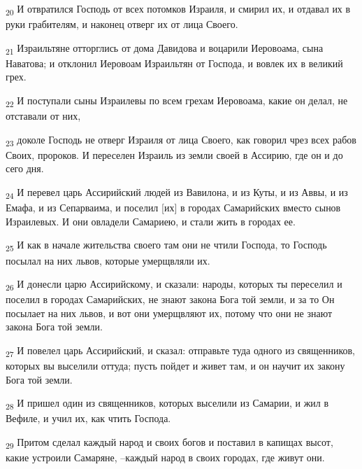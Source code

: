 \begin{tcolorbox}
\textsubscript{20} И отвратился Господь от всех потомков Израиля, и смирил их, и отдавал их в руки грабителям, и наконец отверг их от лица Своего.
\end{tcolorbox}
\begin{tcolorbox}
\textsubscript{21} Израильтяне отторглись от дома Давидова и воцарили Иеровоама, сына Наватова; и отклонил Иеровоам Израильтян от Господа, и вовлек их в великий грех.
\end{tcolorbox}
\begin{tcolorbox}
\textsubscript{22} И поступали сыны Израилевы по всем грехам Иеровоама, какие он делал, не отставали от них,
\end{tcolorbox}
\begin{tcolorbox}
\textsubscript{23} доколе Господь не отверг Израиля от лица Своего, как говорил чрез всех рабов Своих, пророков. И переселен Израиль из земли своей в Ассирию, где он и до сего дня.
\end{tcolorbox}
\begin{tcolorbox}
\textsubscript{24} И перевел царь Ассирийский людей из Вавилона, и из Куты, и из Аввы, и из Емафа, и из Сепарваима, и поселил [их] в городах Самарийских вместо сынов Израилевых. И они овладели Самариею, и стали жить в городах ее.
\end{tcolorbox}
\begin{tcolorbox}
\textsubscript{25} И как в начале жительства своего там они не чтили Господа, то Господь посылал на них львов, которые умерщвляли их.
\end{tcolorbox}
\begin{tcolorbox}
\textsubscript{26} И донесли царю Ассирийскому, и сказали: народы, которых ты переселил и поселил в городах Самарийских, не знают закона Бога той земли, и за то Он посылает на них львов, и вот они умерщвляют их, потому что они не знают закона Бога той земли.
\end{tcolorbox}
\begin{tcolorbox}
\textsubscript{27} И повелел царь Ассирийский, и сказал: отправьте туда одного из священников, которых вы выселили оттуда; пусть пойдет и живет там, и он научит их закону Бога той земли.
\end{tcolorbox}
\begin{tcolorbox}
\textsubscript{28} И пришел один из священников, которых выселили из Самарии, и жил в Вефиле, и учил их, как чтить Господа.
\end{tcolorbox}
\begin{tcolorbox}
\textsubscript{29} Притом сделал каждый народ и своих богов и поставил в капищах высот, какие устроили Самаряне, --каждый народ в своих городах, где живут они.
\end{tcolorbox}
